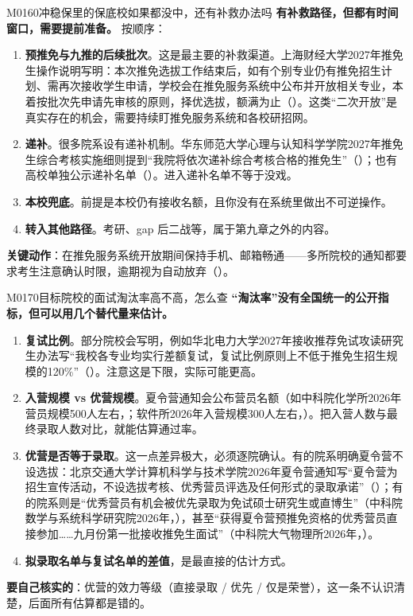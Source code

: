 \begin{qa}{M0160}{冲稳保里的保底校如果都没中，还有补救办法吗}
\textbf{有补救路径，但都有时间窗口，需要提前准备。} 按顺序：
\begin{enumerate}
  \item \textbf{预推免与九推的后续批次}。这是最主要的补救渠道。上海财经大学2027年推免生操作说明写明：本次推免选拔工作结束后，如有个别专业仍有推免招生计划、需再次接收学生申请，学校会在推免服务系统中公布并开放相关专业，本着按批次先申请先审核的原则，择优选拔，额满为止（）。这类“二次开放”是真实存在的机会，需要持续盯推免服务系统和各校研招网。
  \item \textbf{递补}。很多院系设有递补机制。华东师范大学心理与认知科学学院2027年推免生综合考核实施细则提到“我院将依次递补综合考核合格的推免生”（）；也有高校单独公示递补名单（）。进入递补名单不等于没戏。
  \item \textbf{本校兜底}。前提是本校仍有接收名额，且你没有在系统里做出不可逆操作。
  \item \textbf{转入其他路径}。考研、gap 后二战等，属于第九章之外的内容。
\end{enumerate}
\textbf{关键动作}：在推免服务系统开放期间保持手机、邮箱畅通——多所院校的通知都要求考生注意确认时限，逾期视为自动放弃（）。
\end{qa}

\begin{qa}{M0170}{目标院校的面试淘汰率高不高，怎么查}
\textbf{“淘汰率”没有全国统一的公开指标，但可以用几个替代量来估计。}
\begin{enumerate}
  \item \textbf{复试比例}。部分院校会写明，例如华北电力大学2027年接收推荐免试攻读研究生办法写“我校各专业均实行差额复试，复试比例原则上不低于推免生招生规模的120\%”（）。注意这是下限，实际可能更高。
  \item \textbf{入营规模 vs 优营规模}。夏令营通知会公布营员名额（如中科院化学所2026年营员规模500人左右，；软件所2026年入营规模300人左右，）。把入营人数与最终录取人数对比，就能估算通过率。
  \item \textbf{优营是否等于录取}。这一点差异极大，必须逐院确认。有的院系明确夏令营不设选拔：北京交通大学计算机科学与技术学院2026年夏令营通知写“夏令营为招生宣传活动，不设选拔考核、优秀营员评选及任何形式的录取承诺”（）；有的院系则是“优秀营员有机会被优先录取为免试硕士研究生或直博生”（中科院数学与系统科学研究院2026年，），甚至“获得夏令营预推免资格的优秀营员直接参加……九月份第一批接收推免生面试”（中科院大气物理所2026年，）。
  \item \textbf{拟录取名单与复试名单的差值}，是最直接的估计方式。
\end{enumerate}
\textbf{要自己核实的}：优营的效力等级（直接录取 / 优先 / 仅是荣誉），这一条不认识清楚，后面所有估算都是错的。
\end{qa}


